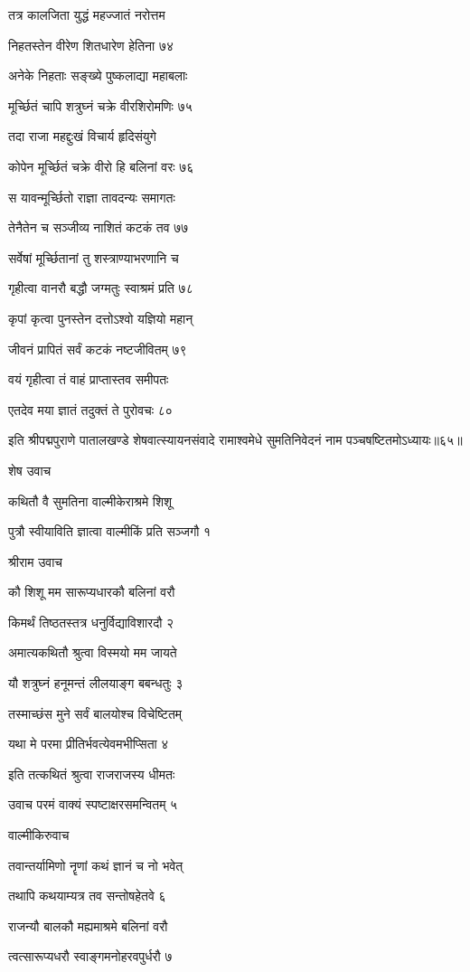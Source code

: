 तत्र कालजिता युद्धं महज्जातं नरोत्तम

निहतस्तेन वीरेण शितधारेण हेतिना ७४

अनेके निहताः सङ्ख्ये पुष्कलाद्या महाबलाः

मूर्च्छितं चापि शत्रुघ्नं चक्रे वीरशिरोमणिः ७५

तदा राजा महद्दुःखं विचार्य हृदिसंयुगे

कोपेन मूर्च्छितं चक्रे वीरो हि बलिनां वरः ७६

स यावन्मूर्च्छितो राज्ञा तावदन्यः समागतः

तेनैतेन च सञ्जीव्य नाशितं कटकं तव ७७

सर्वेषां मूर्च्छितानां तु शस्त्राण्याभरणानि च

गृहीत्वा वानरौ बद्धौ जग्मतुः स्वाश्रमं प्रति ७८

कृपां कृत्वा पुनस्तेन दत्तोऽश्वो यज्ञियो महान्

जीवनं प्रापितं सर्वं कटकं नष्टजीवितम् ७९

वयं गृहीत्वा तं वाहं प्राप्तास्तव समीपतः

एतदेव मया ज्ञातं तदुक्तं ते पुरोवचः ८०

इति श्रीपद्मपुराणे पातालखण्डे शेषवात्स्यायनसंवादे रामाश्वमेधे सुमतिनिवेदनं नाम पञ्चषष्टितमोऽध्यायः॥६५॥


शेष उवाच

कथितौ वै सुमतिना वाल्मीकेराश्रमे शिशू

पुत्रौ स्वीयाविति ज्ञात्वा वाल्मीकिं प्रति सञ्जगौ १

श्रीराम उवाच

कौ शिशू मम सारूप्यधारकौ बलिनां वरौ

किमर्थं तिष्ठतस्तत्र धनुर्विद्याविशारदौ २

अमात्यकथितौ श्रुत्वा विस्मयो मम जायते

यौ शत्रुघ्नं हनूमन्तं लीलयाङ्ग बबन्धतुः ३

तस्माच्छंस मुने सर्वं बालयोश्च विचेष्टितम्

यथा मे परमा प्रीतिर्भवत्येवमभीप्सिता ४

इति तत्कथितं श्रुत्वा राजराजस्य धीमतः

उवाच परमं वाक्यं स्पष्टाक्षरसमन्वितम् ५

वाल्मीकिरुवाच

तवान्तर्यामिणो नॄणां कथं ज्ञानं च नो भवेत्

तथापि कथयाम्यत्र तव सन्तोषहेतवे ६

राजन्यौ बालकौ मह्यमाश्रमे बलिनां वरौ

त्वत्सारूप्यधरौ स्वाङ्गमनोहरवपुर्धरौ ७

